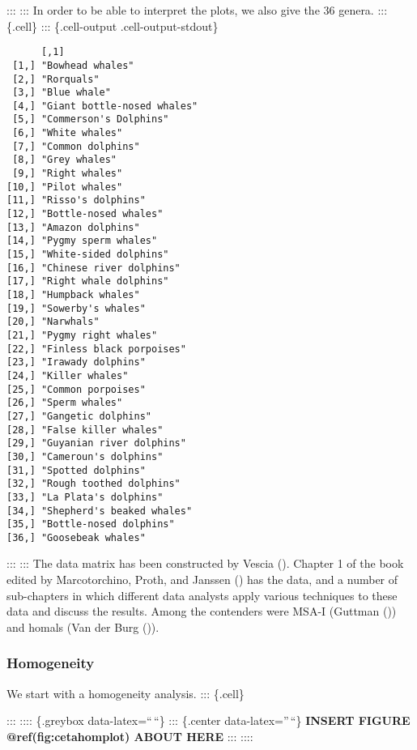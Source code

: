 \documentclass[
  12pt,
  letterpaper,
  DIV=11,
  numbers=noendperiod]{scrartcl}
\begin{document}
::: ::: In order to be able to interpret the plots, we also give the 36
genera. ::: \{.cell\} ::: \{.cell-output .cell-output-stdout\}

\begin{verbatim}
      [,1]                       
 [1,] "Bowhead whales"           
 [2,] "Rorquals"                 
 [3,] "Blue whale"               
 [4,] "Giant bottle-nosed whales"
 [5,] "Commerson's Dolphins"     
 [6,] "White whales"             
 [7,] "Common dolphins"          
 [8,] "Grey whales"              
 [9,] "Right whales"             
[10,] "Pilot whales"             
[11,] "Risso's dolphins"         
[12,] "Bottle-nosed whales"      
[13,] "Amazon dolphins"          
[14,] "Pygmy sperm whales"       
[15,] "White-sided dolphins"     
[16,] "Chinese river dolphins"   
[17,] "Right whale dolphins"     
[18,] "Humpback whales"          
[19,] "Sowerby's whales"         
[20,] "Narwhals"                 
[21,] "Pygmy right whales"       
[22,] "Finless black porpoises"  
[23,] "Irawady dolphins"         
[24,] "Killer whales"            
[25,] "Common porpoises"         
[26,] "Sperm whales"             
[27,] "Gangetic dolphins"        
[28,] "False killer whales"      
[29,] "Guyanian river dolphins"  
[30,] "Cameroun's dolphins"      
[31,] "Spotted dolphins"         
[32,] "Rough toothed dolphins"   
[33,] "La Plata's dolphins"      
[34,] "Shepherd's beaked whales" 
[35,] "Bottle-nosed dolphins"    
[36,] "Goosebeak whales"         
\end{verbatim}

::: ::: The data matrix has been constructed by Vescia
(). Chapter 1 of the book edited by
Marcotorchino, Proth, and Janssen
() has the data, and
a number of sub-chapters in which different data analysts apply various
techniques to these data and discuss the results. Among the contenders
were MSA-I (Guttman ()) and homals (Van
der Burg ()).

\subsubsection{Homogeneity}\label{homogeneity-1}

We start with a homogeneity analysis. ::: \{.cell\}

::: :::: \{.greybox data-latex=``\,``\} ::: \{.center
data-latex=''\,``\} \textbf{INSERT FIGURE @ref(fig:cetahomplot) ABOUT
HERE} ::: ::::
\end{document}

